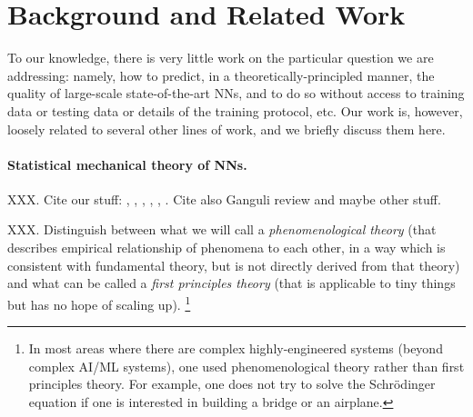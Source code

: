\section{Background and Related Work}
\label{sxn:background}


To our knowledge, there is very little work on the particular question we are addressing: namely, how to predict, in a theoretically-principled manner, the quality of large-scale state-of-the-art NNs, and to do so without access to training data or testing data or details of the training protocol, etc.
Our work is, however, loosely related to several other lines of work, and we briefly discuss them here.

\paragraph{Statistical mechanical theory of NNs.}

XXX.
Cite our stuff:
\cite{MM17_TR},
\cite{MM18_TR},
\cite{MM19_HTSR_ICML},
\cite{weightwatcher_package}
\cite{MM19_KDD},
\cite{MM20_SDM},
\cite{MM20_unpub_work}.
Cite also Ganguli review and maybe other stuff.

XXX.
Distinguish between what we will call a
\emph{phenomenological theory}
(that describes empirical relationship of phenomena to each other, in a way which is consistent with fundamental theory, but is not directly derived from that theory)
and what can be called a 
\emph{first principles theory} 
(that is applicable to tiny things but has no hope of scaling up).
\footnote{In most areas where there are complex highly-engineered systems (beyond complex AI/ML systems), one used phenomenological theory rather than first principles theory.  For example, one does not try to solve the Schr\"odinger equation if one is interested in building a bridge or an airplane.}

